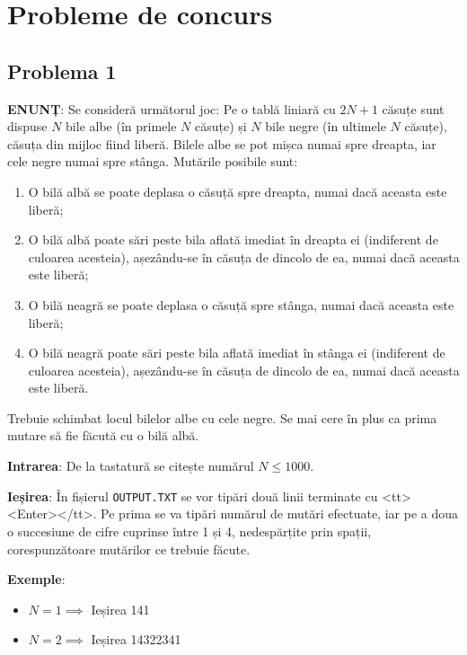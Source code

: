 \chapter{Probleme de concurs}

\section{Problema 1}

{\bf ENUNȚ}: Se consideră următorul joc: Pe o tablă liniară cu $2N+1$ căsuțe
sunt dispuse $N$ bile albe (în primele $N$ căsuțe) și $N$ bile negre (în
ultimele $N$ căsuțe), căsuța din mijloc fiind liberă. Bilele albe se pot mișca
numai spre dreapta, iar cele negre numai spre stânga. Mutările posibile sunt:

\begin{enumerate}

\item O bilă albă se poate deplasa o căsuță spre dreapta, numai dacă aceasta
  este liberă;

\item O bilă albă poate sări peste bila aflată imediat în dreapta ei
  (indiferent de culoarea acesteia), așezându-se în căsuța de dincolo de ea,
  numai dacă aceasta este liberă;

\item O bilă neagră se poate deplasa o căsuță spre stânga, numai dacă aceasta
  este liberă;

\item O bilă neagră poate sări peste bila aflată imediat în stânga ei
  (indiferent de culoarea acesteia), așezându-se în căsuța de dincolo de ea,
  numai dacă aceasta este liberă.

\end{enumerate}

Trebuie schimbat locul bilelor albe cu cele negre. Se mai cere în plus ca
prima mutare să fie făcută cu o bilă albă.

{\bf Intrarea}: De la tastatură se citește numărul $N \leq 1000$.

{\bf Ieșirea}: În fișierul {\tt OUTPUT.TXT} se vor tipări două linii terminate
cu <tt><Enter></tt>. Pe prima se va tipări numărul de mutări efectuate, iar pe
a doua o succesiune de cifre cuprinse între 1 și 4, nedespărțite prin spații,
corespunzătoare mutărilor ce trebuie făcute.

{\bf Exemple}:

\begin{itemize}

\item $N=1 \implies$ Ieșirea 141

\item $N=2 \implies$ Ieșirea 14322341

\end{itemize}

